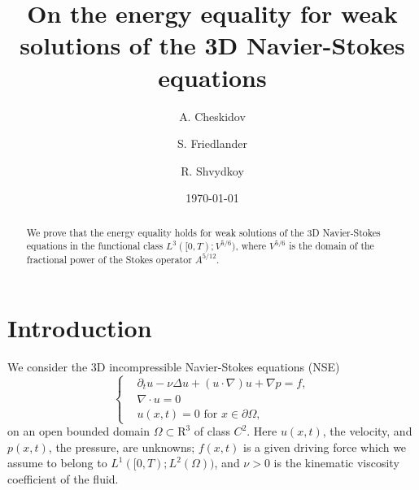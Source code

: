 \documentclass[12pt]{amsart}
\theoremstyle{plain}
\theoremstyle{definition}
\theoremstyle{remark}
\begin{document}
\title[Energy equality for 3D Navier-Stokes]{On the energy equality for weak solutions of the 3D Navier-Stokes equations}

\author{ A. Cheskidov}
\address[A. Cheskidov]
         {Department of Mathematics\\
          University of Michigan\\
          Ann Arbor, MI 48109}

\author{S. Friedlander}
\address[S. Friedlander and R. Shvydkoy]
{Department of Mathematics, Stat. and Comp. Sci.\\
        University of Illinois\\
        Chicago, IL 60607}

\author{R. Shvydkoy}

\date{\today}

\begin{abstract}
We prove that the energy equality holds for weak solutions of the 3D
Navier-Stokes equations in the functional class $L^3([0,T);V^{5/6})$, where
$V^{5/6}$ is the domain of the fractional power of the Stokes operator $A^{5/12}$.
\end{abstract}



\maketitle

\section{Introduction}
We consider the 3D incompressible Navier-Stokes equations (NSE)
\begin{equation} \label{NSE1}
\left\{
\begin{aligned}
&{\partial}_t u - \nu \Delta u + (u \cdot \nabla)u + \nabla p = f,\\
&\nabla \cdot u =0 \\
&u(x,t) = 0 \text{ for } x \in {\partial} \Omega,
\end{aligned}
\right.
\end{equation}
on an open bounded domain  $\Omega \subset \mathrm{R}^3$ of class $C^2$.
Here $u(x,t)$, the velocity, and $p(x,t)$, the pressure, are unknowns; $f(x,t)$ is
a given driving force which we assume to belong to $L^1([0,T);L^2(\Omega))$, and $\nu>0$ is the kinematic  viscosity coefficient of the fluid.
\end{document}
